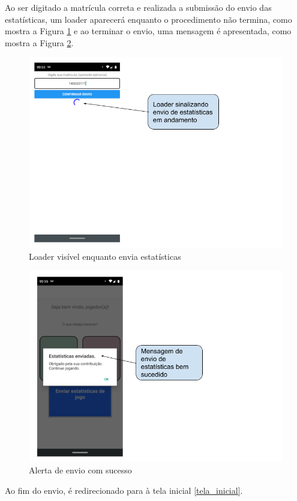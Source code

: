 Ao ser digitado a matrícula correta e realizada a submissão do envio das estatísticas, um loader aparecerá enquanto o procedimento não termina, como mostra a Figura \ref{loader} e ao terminar o envio, uma mensagem é apresentada, como mostra a Figura \ref{estatisticas_sucesso_envio}.

\begin{figure}[H]
\centering
\caption{Loader visível enquanto envia estatísticas}
\includegraphics[scale=0.5]{figuras/estatisticas/loader_estatisticas.png}

\label{loader}
\end{figure}


\begin{figure}[H]
\centering
\caption{Alerta de envio com sucesso}
\includegraphics[scale=0.5]{figuras/estatisticas/estatisticas_enviadas.png}

\label{estatisticas_sucesso_envio}
\end{figure}

Ao fim do envio, é redirecionado para à tela inicial \ref{tela_inicial}.
